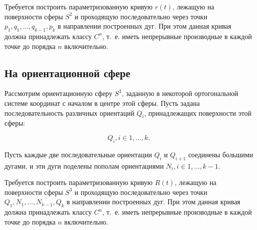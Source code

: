 Требуется построить параметризованную кривую $r(t)$, лежащую на поверхности сферы $S^2$ и проходящую последовательно
через точки $p_1, q_1, \dots, q_{k-1}, p_k$ в направлении построенных дуг. При этом данная кривая должна
принадлежать классу $C^n$, т.~е. иметь непрерывные производные в каждой точке до порядка $n$ включительно.

\subsection*{На ориентационной сфере}

Рассмотрим ориентационную сферу $S^3$, заданную в некоторой ортогональной сис\-теме координат с началом в центре этой
сферы. Пусть задана последовательность различных ориентаций $Q_i$, принадлежащих поверхности этой сферы:

$${Q_i}, i \in {1, \dots, k}.$$

Пусть каждые две последовательные ориентации $Q_i$ и $Q_{i+1}$ соединены большими дугами, и эти дуги поделены пополам
ориентациями $N_i, i \in {1, \dots, k-1}$.

Требуется построить параметризованную кривую $R(t)$, лежащую на поверхности сферы $S^3$ и проходящую последовательно
через точки $Q_1, N_1, \dots, N_{k-1}, Q_k$ в направлении построенных дуг. При этом данная кривая должна
принадлежать классу $C^n$, т.~е. иметь непрерывные производные в каждой точке до порядка $n$ включительно.
